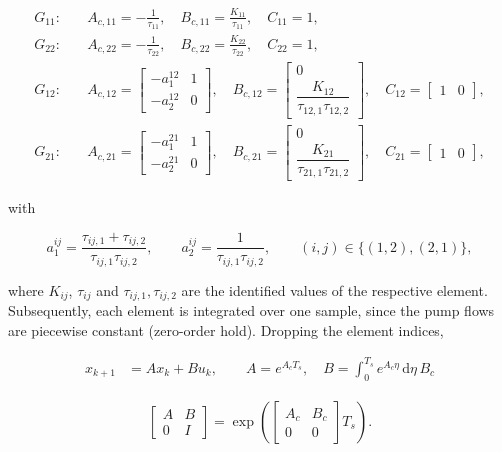 \begin{align}
  G_{11}:&\quad A_{c,11} = -\frac{1}{\tau_{11}},\quad
                B_{c,11} = \frac{K_{11}}{\tau_{11}},\quad
                C_{11} = 1, \\
  G_{22}:&\quad A_{c,22} = -\frac{1}{\tau_{22}},\quad
                B_{c,22} = \frac{K_{22}}{\tau_{22}},\quad
                C_{22} = 1, \\
  G_{12}:&\quad A_{c,12} = \begin{bmatrix}-a^{12}_1&1\\-a^{12}_2&0\end{bmatrix},\quad
                B_{c,12} = \begin{bmatrix}0\\ \dfrac{K_{12}}{\tau_{12,1}\tau_{12,2}}\end{bmatrix},\quad
                C_{12} = \begin{bmatrix}1&0\end{bmatrix}, \\
  G_{21}:&\quad A_{c,21} = \begin{bmatrix}-a^{21}_1&1\\-a^{21}_2&0\end{bmatrix},\quad
                B_{c,21} = \begin{bmatrix}0\\ \dfrac{K_{21}}{\tau_{21,1}\tau_{21,2}}\end{bmatrix},\quad
                C_{21} = \begin{bmatrix}1&0\end{bmatrix},
\end{align}

with

\begin{equation}
  a^{ij}_1=\frac{\tau_{ij,1}+\tau_{ij,2}}{\tau_{ij,1}\tau_{ij,2}},\qquad
  a^{ij}_2=\frac{1}{\tau_{ij,1}\tau_{ij,2}},\qquad (i,j)\in\{(1,2),(2,1)\},
\end{equation}

where $K_{ij}$, $\tau_{ij}$ and $\tau_{ij,1},\tau_{ij,2}$ are the identified values of the respective element. Subsequently, each element is integrated over one sample, since the pump flows are piecewise constant (zero-order hold). Dropping the element indices,

\begin{align}
  x_{k+1} &= Ax_k + Bu_k, \qquad
  A = e^{A_cT_s}, \quad B = \int_0^{T_s} e^{A_c\eta}\,\mathrm{d}\eta\,B_c
\end{align}

\begin{align}
    \begin{bmatrix} A & B \\ 0 & I \end{bmatrix}
  = \exp\!\left(\begin{bmatrix} A_c & B_c \\ 0 & 0 \end{bmatrix} T_s\right).
\end{align}

